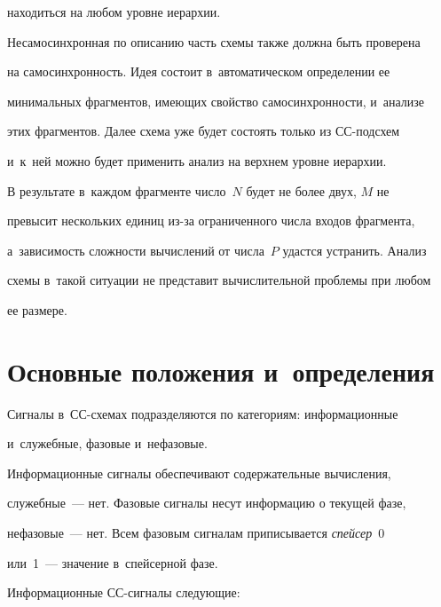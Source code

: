 находиться на любом уровне иерархии.


   


   Несамосинхронная по описанию часть схемы также должна быть проверена 


на самосинхронность. Идея состоит в~автоматическом определении ее 


минимальных фрагментов, имеющих свойство самосинхронности, и~анализе 


этих фрагментов. Далее схема уже будет состоять только из СС-под\-схем 


и~к~ней можно будет применить анализ на верхнем уровне иерархии.


   


   В результате в~каждом фрагменте число~$N$ будет не более двух, $M$ не 


превысит нескольких единиц из-за ограниченного числа входов фрагмента, 


а~зависимость сложности вычислений от числа~$P$ удастся устранить. Анализ 


схемы в~такой ситуации не представит вычислительной проблемы при любом 


ее размере. 





\section{Основные положения и~определения}


       


   Сигналы в~СС-схемах подразделяются по категориям: информационные 


и~служебные, фазовые и~нефазовые.


   


   Информационные сигналы обеспечивают содержательные вычисления, 


служебные~--- нет. Фазовые сигналы несут информацию о текущей фазе, 


нефазовые~--- нет. Всем фазовым сигналам приписывается \textit{спейсер}~0 


или~1~--- значение в~спейсерной фазе.


   


   Информационные СС-сигналы следующие:


